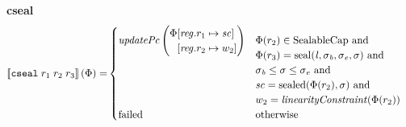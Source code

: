 \documentclass[a3paper]{article}
\newcommand{\sem}[1]{\left\llbracket #1 \right\rrbracket}
\newcommand{\tand}{\text{ and }}
\newcommand{\totherwise}{\text{otherwise }}
\newcommand{\targetcolor}[1]{\color{black}}
\newcommand{\trg}[1]{{\targetcolor{} #1}}
\newcommand{\zinstr}[1]{\texttt{#1}}
\newcommand{\threeinstr}[4]{
  \ifthenelse{\equal{#2#3#4}{}}
  {\zinstr{#1}}
  {\zinstr{#1} \; #2 \; #3 \; #4}
}
\newcommand{\tcseal}[3]{\threeinstr{\trg{cseal}}{#1}{#2}{#3}}
\newcommand{\update}[2]{[#1 \mapsto #2]}
\newcommand{\updReg}[2]{\update{\reg.#1}{#2}}
\newcommand{\shareddom}[1]{\mathrm{#1}}
\newcommand{\SealableCaps}{\shareddom{SealableCap}}
\newcommand{\lin}{\var{l}}
\newcommand{\seal}[1]{\shareddom{seal}(#1)}
\newcommand{\sealed}[1]{\shareddom{sealed}(#1)}
\newcommand{\failed}{\mathrm{failed}}
\newcommand{\var}[1]{\mathit{#1}}
\newcommand{\reg}{\var{reg}}
\newcommand{\vsc}{\var{sc}}
\newcommand{\baddr}{\var{b}}
\newcommand{\eaddr}{\var{e}}
\newcommand{\plainfun}[2]{
  \ifthenelse{\equal{#2}{}}
  {\mathit{#1}}
  {\mathit{#1}(#2)}
}
\newcommand{\linCons}[1]{\plainfun{linearityConstraint}{#1}}
\newcommand{\updPcAddr}[1]{\plainfun{updatePc}{#1}}
\begin{document}
\noindent\textbf{cseal}\\
\begin{align*}
  \sem{\tcseal{r_1}{r_2}{r_3}}(\Phi) = &
                                  \begin{cases}
                                    \updPcAddr{}\left(
                                    \arraycolsep=0pt
                                    \begin{array}{rl}
                                      \Phi&\updReg{r_1}{\vsc}\\
                                          &\updReg{r_2}{w_2}
                                    \end{array}\right)
&
                                    \arraycolsep=0pt
                                    \begin{array}[t]{l}
                                      \Phi(r_2) \in \SealableCaps \tand \\
                                      \Phi(r_3) = \seal{\lin, \sigma_\baddr, \sigma_\eaddr,\sigma} \tand \\
                                      \sigma_\baddr \leq \sigma \leq \sigma_\eaddr \tand \\ 
                                      \vsc = \sealed{\Phi(r_2),\sigma} \tand\\
                                      w_2 = \linCons{\Phi(r_2)}                                     
                                    \end{array}
                                    \\
                                    \failed & \totherwise
                                  \end{cases}
\end{align*}
\end{document}
